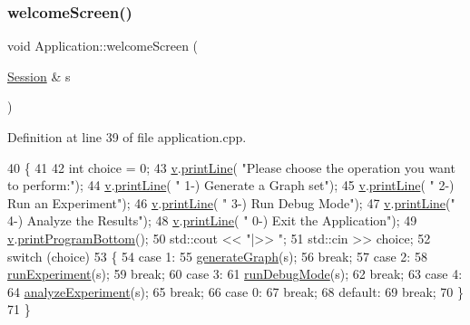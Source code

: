 \subsubsection{\texorpdfstring{welcome\+Screen()}{welcomeScreen()}}
{\footnotesize\ttfamily void Application\+::welcome\+Screen (\begin{DoxyParamCaption}\item[{\hyperlink{struct_session}{Session} \&}]{s }\end{DoxyParamCaption})}



Definition at line 39 of file application.\+cpp.


\begin{DoxyCode}
40 \{
41     
42     \textcolor{keywordtype}{int} choice = 0;
43     \hyperlink{class_application_a96cff2295a95d7e6de06638bb7e61243}{v}.\hyperlink{class_visualize_abce6cd538dc0715b21851e0bf0377d85}{printLine}( \textcolor{stringliteral}{"Please choose the operation you want to perform:"});
44     \hyperlink{class_application_a96cff2295a95d7e6de06638bb7e61243}{v}.\hyperlink{class_visualize_abce6cd538dc0715b21851e0bf0377d85}{printLine}( \textcolor{stringliteral}{" 1-) Generate a Graph set"});
45     \hyperlink{class_application_a96cff2295a95d7e6de06638bb7e61243}{v}.\hyperlink{class_visualize_abce6cd538dc0715b21851e0bf0377d85}{printLine}( \textcolor{stringliteral}{" 2-) Run an Experiment"});
46     \hyperlink{class_application_a96cff2295a95d7e6de06638bb7e61243}{v}.\hyperlink{class_visualize_abce6cd538dc0715b21851e0bf0377d85}{printLine}( \textcolor{stringliteral}{" 3-) Run Debug Mode"});
47     \hyperlink{class_application_a96cff2295a95d7e6de06638bb7e61243}{v}.\hyperlink{class_visualize_abce6cd538dc0715b21851e0bf0377d85}{printLine}(\textcolor{stringliteral}{" 4-) Analyze the Results"});
48     \hyperlink{class_application_a96cff2295a95d7e6de06638bb7e61243}{v}.\hyperlink{class_visualize_abce6cd538dc0715b21851e0bf0377d85}{printLine}( \textcolor{stringliteral}{" 0-) Exit the Application"});
49     \hyperlink{class_application_a96cff2295a95d7e6de06638bb7e61243}{v}.\hyperlink{class_visualize_ac0be9ece2d80a7d1e34724fb87424216}{printProgramBottom}();
50     std::cout << \textcolor{stringliteral}{"|>> "};
51     std::cin >> choice;
52     \textcolor{keywordflow}{switch} (choice)
53     \{
54     \textcolor{keywordflow}{case} 1:
55         \hyperlink{class_application_a169c37596e9a7a9e0546700876adcbe7}{generateGraph}(s);
56         \textcolor{keywordflow}{break};
57     \textcolor{keywordflow}{case} 2: 
58         \hyperlink{class_application_a1d9cfbea705655427e7d1847de2567c1}{runExperiment}(s);
59         \textcolor{keywordflow}{break};
60     \textcolor{keywordflow}{case} 3:
61         \hyperlink{class_application_adb639e3593f8f6f4dcb3d89d690eb538}{runDebugMode}(s);
62         \textcolor{keywordflow}{break};
63     \textcolor{keywordflow}{case} 4:
64         \hyperlink{class_application_ae0d3919fe03bae0b3ce31ef4be49374d}{analyzeExperiment}(s);
65         \textcolor{keywordflow}{break};
66     \textcolor{keywordflow}{case} 0:
67         \textcolor{keywordflow}{break};
68     \textcolor{keywordflow}{default}:
69         \textcolor{keywordflow}{break};
70     \}
71 \}
\end{DoxyCode}


